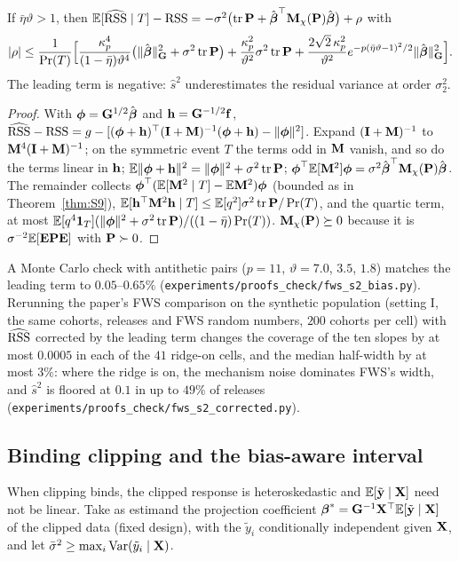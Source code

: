 \begin{proposition}\label{prop:S10a}
If $\bar\eta\vartheta>1$, then $\mathbb{E}[\widehat{\mathrm{RSS}}\mid T]-\mathrm{RSS}=-\sigma^2\bigl(\operatorname{tr}\mathbf{P}+\hat{\boldsymbol{\beta}}^\top\mathbf{M}_\chi(\mathbf{P})\hat{\boldsymbol{\beta}}\bigr)+\rho$ with
\[
  |\rho|\le\frac1{\Pr(T)}\Bigl[\frac{\kappa_p^4}{(1-\bar\eta)\vartheta^4}\bigl(\|\hat{\boldsymbol{\beta}}\|_{\mathbf{G}}^2+\sigma^2\operatorname{tr}\mathbf{P}\bigr)+\frac{\kappa_p^2}{\vartheta^2}\sigma^2\operatorname{tr}\mathbf{P}+\frac{2\sqrt2\,\kappa_p^2}{\vartheta^2}e^{-p(\bar\eta\vartheta-1)^2/2}\|\hat{\boldsymbol{\beta}}\|_{\mathbf{G}}^2\Bigr].
\]
The leading term is negative: $\hat s^2$ underestimates the residual variance at order $\sigma_2^2$.
\end{proposition}
\begin{proof}
With $\boldsymbol{\phi}=\mathbf{G}^{1/2}\hat{\boldsymbol{\beta}}$ and $\mathbf{h}=\mathbf{G}^{-1/2}\mathbf{f}$, $\widehat{\mathrm{RSS}}-\mathrm{RSS}=g-[(\boldsymbol{\phi}+\mathbf{h})^\top(\mathbf{I}+\mathbf{M})^{-1}(\boldsymbol{\phi}+\mathbf{h})-\|\boldsymbol{\phi}\|^2]$. Expand $(\mathbf{I}+\mathbf{M})^{-1}$ to $\mathbf{M}^4(\mathbf{I}+\mathbf{M})^{-1}$; on the symmetric event $T$ the terms odd in $\mathbf{M}$ vanish, and so do the terms linear in $\mathbf{h}$; $\mathbb{E}\|\boldsymbol{\phi}+\mathbf{h}\|^2=\|\boldsymbol{\phi}\|^2+\sigma^2\operatorname{tr}\mathbf{P}$; $\boldsymbol{\phi}^\top\mathbb{E}[\mathbf{M}^2]\boldsymbol{\phi}=\sigma^2\hat{\boldsymbol{\beta}}^\top\mathbf{M}_\chi(\mathbf{P})\hat{\boldsymbol{\beta}}$. The remainder collects $\boldsymbol{\phi}^\top(\mathbb{E}[\mathbf{M}^2\mid T]-\mathbb{E}\mathbf{M}^2)\boldsymbol{\phi}$ (bounded as in Theorem~\ref{thm:S9}), $\mathbb{E}[\mathbf{h}^\top\mathbf{M}^2\mathbf{h}\mid T]\le\mathbb{E}[q^2]\sigma^2\operatorname{tr}\mathbf{P}/\Pr(T)$, and the quartic term, at most $\mathbb{E}[q^4\mathbf 1_T](\|\boldsymbol{\phi}\|^2+\sigma^2\operatorname{tr}\mathbf{P})/((1-\bar\eta)\Pr(T))$. $\mathbf{M}_\chi(\mathbf{P})\succeq0$ because it is $\sigma^{-2}\mathbb{E}[\mathbf{E}\mathbf{P}\mathbf{E}]$ with $\mathbf{P}\succ0$.
\end{proof}
A Monte Carlo check with antithetic pairs ($p=11$, $\vartheta=7.0$, $3.5$, $1.8$) matches the leading term to $0.05$--$0.65\%$ (\texttt{experiments/proofs\_check/fws\_s2\_bias.py}). Rerunning the paper's FWS comparison on the synthetic population (setting I, the same cohorts, releases and FWS random numbers, $200$ cohorts per cell) with $\widehat{\mathrm{RSS}}$ corrected by the leading term changes the coverage of the ten slopes by at most $0.0005$ in each of the $41$ ridge-on cells, and the median half-width by at most $3\%$: where the ridge is on, the mechanism noise dominates FWS's width, and $\hat s^2$ is floored at $0.1$ in up to $49\%$ of releases (\texttt{experiments/proofs\_check/fws\_s2\_corrected.py}).

\subsection{Binding clipping and the bias-aware interval}

When clipping binds, the clipped response is heteroskedastic and $\mathbb{E}[\tilde{\mathbf{y}}\mid\mathbf{X}]$ need not be linear. Take as estimand the projection coefficient $\boldsymbol{\beta}^\ast=\mathbf{G}^{-1}\mathbf{X}^\top\mathbb{E}[\tilde{\mathbf{y}}\mid\mathbf{X}]$ of the clipped data (fixed design), with the $\tilde y_i$ conditionally independent given $\mathbf{X}$, and let $\bar\sigma^2\ge\max_i\operatorname{Var}(\tilde y_i\mid\mathbf{X})$.


